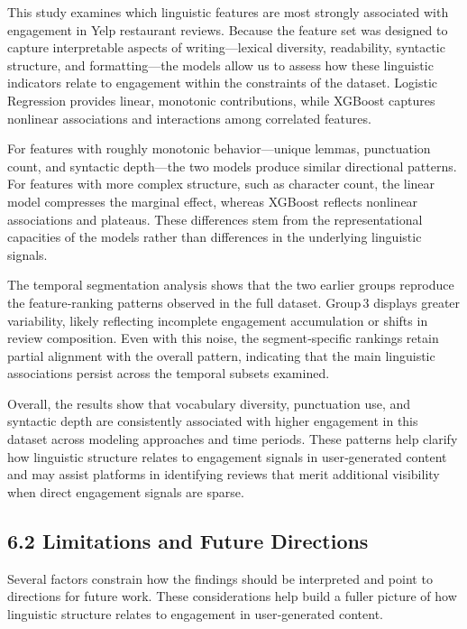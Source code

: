 \documentclass[
]{article}
\begin{document}
This study examines which linguistic features are most strongly
associated with engagement in Yelp restaurant reviews. Because the
feature set was designed to capture interpretable aspects of
writing---lexical diversity, readability, syntactic structure, and
formatting---the models allow us to assess how these linguistic
indicators relate to engagement within the constraints of the dataset.
Logistic Regression provides linear, monotonic contributions, while
XGBoost captures nonlinear associations and interactions among
correlated features.

For features with roughly monotonic behavior---unique lemmas,
punctuation count, and syntactic depth---the two models produce similar
directional patterns. For features with more complex structure, such as
character count, the linear model compresses the marginal effect,
whereas XGBoost reflects nonlinear associations and plateaus. These
differences stem from the representational capacities of the models
rather than differences in the underlying linguistic signals.

The temporal segmentation analysis shows that the two earlier groups
reproduce the feature‑ranking patterns observed in the full dataset.
Group\,3 displays greater variability, likely reflecting incomplete
engagement accumulation or shifts in review composition. Even with this
noise, the segment‑specific rankings retain partial alignment with the
overall pattern, indicating that the main linguistic associations
persist across the temporal subsets examined.

Overall, the results show that vocabulary diversity, punctuation use,
and syntactic depth are consistently associated with higher engagement
in this dataset across modeling approaches and time periods. These
patterns help clarify how linguistic structure relates to engagement
signals in user‑generated content and may assist platforms in
identifying reviews that merit additional visibility when direct
engagement signals are sparse.

\hypertarget{limitations-and-future-directions}{%
\subsection{6.2 Limitations and Future
Directions}\label{limitations-and-future-directions}}

Several factors constrain how the findings should be interpreted and
point to directions for future work. These considerations help build a
fuller picture of how linguistic structure relates to engagement in
user‑generated content.
\end{document}
